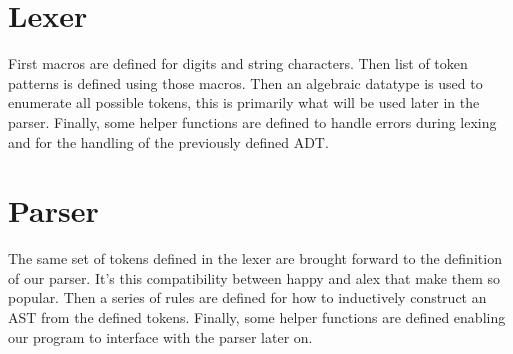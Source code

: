 \documentclass[12pt,a4paper]{report}
\theoremstyle{definition}
\theoremstyle{remark}
\begin{document}
\section{Lexer}\label{appendix: lexer}
First macros are defined for digits and string characters. Then list of token patterns is defined using those macros. Then an algebraic datatype is used to enumerate all possible tokens, this is primarily what will be used later in the parser. Finally, some helper functions are defined to handle errors during lexing and for the handling of the previously defined ADT.



\section{Parser}\label{appendix: parser}
The same set of tokens defined in the lexer are brought forward to the definition of our parser. It's this compatibility between happy and alex that make them so popular. Then a series of rules are defined for how to inductively construct an AST from the defined tokens. Finally, some helper functions are defined enabling our program to interface with the parser later on. 




%
\end{document}
